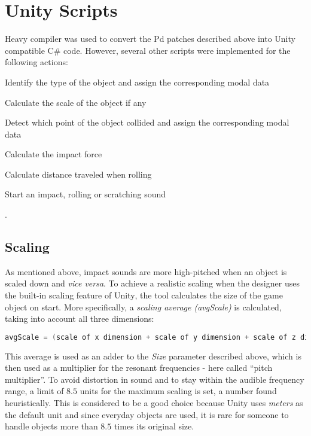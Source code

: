\section{Unity\textsuperscript{\textregistered} Scripts}
Heavy \cite{bib:heavy} compiler was used to convert the \gls{Pd} patches described above into Unity\textsuperscript{\textregistered} compatible C\# code. However, several other scripts were implemented for the following actions: 
\begin{inparaenum}[1)]
\item Identify the type of the object and assign the corresponding modal data
\item Calculate the scale of the object if any
\item Detect which point of the object collided and assign the corresponding modal data
\item Calculate the impact force
\item Calculate distance traveled when rolling
\item Start an impact, rolling or scratching sound 
\end{inparaenum}.   

\subsection{Scaling}
As mentioned above, impact sounds are more high-pitched when an object is scaled down and \textit{vice versa}. To achieve a realistic scaling when the designer uses the built-in scaling feature of Unity\textsuperscript{\textregistered}, the tool calculates the size of the game object on start. More specifically, a \textit{scaling average (avgScale)} is calculated, taking into account all three dimensions:

\begin{lstlisting}[language=C]
avgScale = (scale of x dimension + scale of y dimension + scale of z dimension) / 3
\end{lstlisting}

This average is used as an adder to the \textit{Size} parameter described above, which is then used as a multiplier for the resonant frequencies - here called ``pitch multiplier''. To avoid distortion in sound and to stay within the audible frequency range, a limit of $8.5$ units for the maximum scaling is set, a number found heuristically. This is considered to be a good choice because Unity\textsuperscript{\textregistered} uses \textit{meters} as the default unit and since everyday objects are used, it is rare for someone to handle objects more than $8.5$ times its original size.

